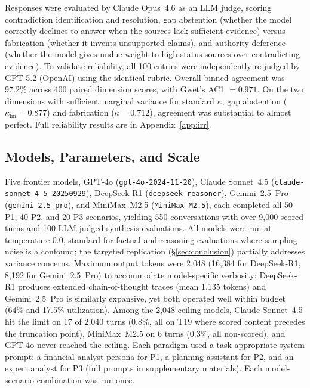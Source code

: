 \documentclass[11pt,a4paper]{article}
\begin{document}
Responses were evaluated by Claude Opus~4.6 as an LLM judge, scoring contradiction identification and resolution, gap abstention (whether the model correctly declines to answer when the sources lack sufficient evidence) versus fabrication (whether it invents unsupported claims), and authority deference (whether the model gives undue weight to high-status sources over contradicting evidence). To validate reliability, all 100 entries were independently re-judged by GPT-5.2 (OpenAI) using the identical rubric. Overall binned agreement was 97.2\% across 400 paired dimension scores, with Gwet's AC1 $= 0.971$. On the two dimensions with sufficient marginal variance for standard $\kappa$, gap abstention ($\kappa_{\mathrm{lin}} = 0.877$) and fabrication ($\kappa = 0.712$), agreement was substantial to almost perfect. Full reliability results are in Appendix~\ref{app:irr}.

\subsection{Models, Parameters, and Scale}
\label{sec:params}

Five frontier models, GPT-4o (\texttt{gpt-4o-2024-11-20}), Claude Sonnet~4.5 (\texttt{claude-sonnet-4-5-20250929}), DeepSeek-R1 (\texttt{deepseek-reasoner}), Gemini~2.5~Pro (\texttt{gemini-2.5-pro}), and MiniMax~M2.5 (\texttt{MiniMax-M2.5}), each completed all 50 P1, 40 P2, and 20 P3 scenarios, yielding 550 conversations with over 9{,}000 scored turns and 100 LLM-judged synthesis evaluations. All models were run at temperature 0.0, standard for factual and reasoning evaluations \citep{lin2022truthfulqa,liang2023helm} where sampling noise is a confound; the targeted replication (\S\ref{sec:conclusion}) partially addresses variance concerns. Maximum output tokens were 2{,}048 (16{,}384 for DeepSeek-R1, 8{,}192 for Gemini~2.5~Pro) to accommodate model-specific verbosity: DeepSeek-R1 produces extended chain-of-thought traces (mean 1{,}135 tokens) and Gemini~2.5~Pro is similarly expansive, yet both operated well within budget (64\% and 17.5\% utilization). Among the 2{,}048-ceiling models, Claude Sonnet~4.5 hit the limit on 17 of 2{,}040 turns (0.8\%, all on T19 where scored content precedes the truncation point), MiniMax~M2.5 on 6 turns (0.3\%, all non-scored), and GPT-4o never reached the ceiling. Each paradigm used a task-appropriate system prompt: a financial analyst persona for P1, a planning assistant for P2, and an expert analyst for P3 (full prompts in supplementary materials). Each model-scenario combination was run once.
\end{document}
